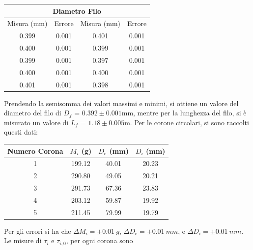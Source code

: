 \documentclass[a4paper]{article}
\begin{document}
\begin{table} [!ht]
    \centering
    \begin{tabular}{|c|c|c|c|}
    \hline
    \multicolumn{4}{|c|}{Diametro Filo} \\
    \hline
    Misura (mm)& Errore & Misura (mm)& Errore \\
    \hline
    0.399 & 0.001 & 0.401 & 0.001 \\
    0.400 & 0.001 & 0.399 & 0.001 \\
    0.399 & 0.001 & 0.397 & 0.001 \\
    0.400 & 0.001 & 0.400 & 0.001 \\
    0.401 & 0.001 & 0.398 & 0.001 \\
    \hline
    \end{tabular}
\end{table}
Prendendo la semisomma dei valori massimi e minimi, si ottiene un valore del diametro del filo di $D_f$ = $0.392\pm{0.001}$mm, mentre per la lunghezza del filo, si è misurato un valore di $L_f$ = $1.18\pm{0.005}$m. Per le corone circolari, si sono raccolti questi dati:
\begin{table}[!ht]
    \centering
    \begin{tabular}{|c|c|c|c|}
    \hline
    Numero Corona & $M_i$ (g)& $D_e$ (mm) & $D_i$ (mm)\\
    \hline    
    1 & 199.12 & 40.01 & 20.23 \\
    2 & 290.80 & 49.05 & 20.21 \\
    3 & 291.73 & 67.36 & 23.83 \\
    4 & 203.12 & 59.87 & 19.92 \\ 
    5 & 211.45 & 79.99 & 19.79 \\
    \hline
    \end{tabular}
\end{table}
\FloatBarrier
Per gli errori si ha che $\Delta M_i = \pm{0.01} \SI{}{g}$, $\Delta D_e = \pm{0.01} \SI{}{mm}$, e $\Delta D_i = \pm{0.01} \SI{}{mm}$. Le misure di $\tau_i$ e $\tau_{i,0}$, per ogni corona sono
\end{document}

